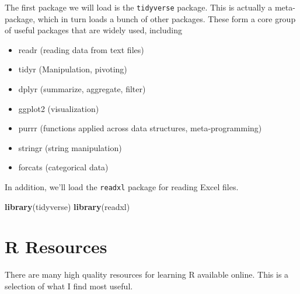 \documentclass[12pt,letterpaperpaper,openany]{book}
\newenvironment{Shaded}{\begin{snugshade}}{\end{snugshade}}
\newcommand{\KeywordTok}[1]{\textcolor[rgb]{0.13,0.29,0.53}{\textbf{#1}}}
\newcommand{\NormalTok}[1]{#1}
\providecommand{\tightlist}{%
  \setlength{\itemsep}{0pt}\setlength{\parskip}{0pt}}
\begin{document}
The first package we will load is the \texttt{tidyverse} package. This is actually a meta-package, which in turn loads a bunch of other packages. These form a core group of useful packages that are widely used, including

\begin{itemize}
\tightlist
\item
  readr (reading data from text files)
\item
  tidyr (Manipulation, pivoting)
\item
  dplyr (summarize, aggregate, filter)
\item
  ggplot2 (visualization)
\item
  purrr (functions applied across data structures, meta-programming)
\item
  stringr (string manipulation)
\item
  forcats (categorical data)
\end{itemize}

In addition, we'll load the \texttt{readxl} package for reading Excel files.

\begin{Shaded}
\begin{Highlighting}[]
\KeywordTok{library}\NormalTok{(tidyverse)}
\KeywordTok{library}\NormalTok{(readxl)}
\end{Highlighting}
\end{Shaded}

\hypertarget{r-resources}{%
\section*{R Resources}\label{r-resources}}

There are many high quality resources for learning R available online. This is a selection of
what I find most useful.
\end{document}
